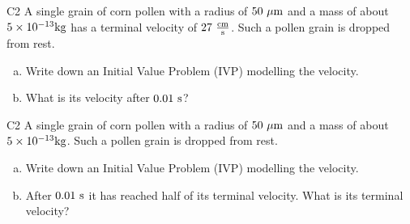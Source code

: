 \begin{problem}{C2}
A single grain of corn pollen with a radius of \(50\ {\rm \mu m}\) and a mass of about \(5 \times 10^{-13} {\rm kg}\) has a terminal velocity of \(27\ {\rm \frac{cm}{s}}\).  Such a pollen grain is dropped from rest.  
\begin{enumerate}[(a)]
\item Write down an Initial Value Problem (IVP) modelling the velocity.
\item What is its velocity after \(0.01\ {\rm s}\)?
\end{enumerate}
\end{problem}

\begin{problem}{C2}
A single grain of corn pollen with a radius of \(50\ {\rm \mu m}\) and a mass of about \(5 \times 10^{-13} {\rm kg}\).  Such a pollen grain is dropped from rest.  
\begin{enumerate}[(a)]
\item Write down an Initial Value Problem (IVP) modelling the velocity.
\item After  \(0.01\ {\rm s}\) it has reached half of its terminal velocity.  What is its terminal velocity?
\end{enumerate}
\end{problem}
